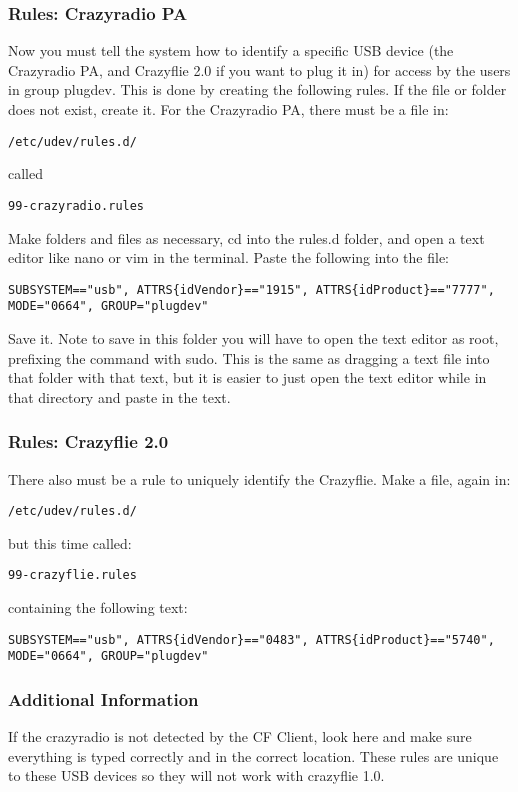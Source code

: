 \documentclass[12pt]{article}
\begin{document}
\subsubsection{Rules: Crazyradio PA}
Now you must tell the system how to identify a specific USB device (the Crazyradio PA, and Crazyflie 2.0 if you want to plug it in) for access by the users in group plugdev. This is done by creating the following rules. If the file or folder does not exist, create it.
For the Crazyradio PA, there must be a file in:
\begin{verbatim}
/etc/udev/rules.d/
\end{verbatim}
called
\begin{verbatim}
99-crazyradio.rules
\end{verbatim}
Make folders and files as necessary, cd into the rules.d folder, and open a text editor like nano or vim in the terminal. Paste the following into the file:
\begin{verbatim}
SUBSYSTEM=="usb", ATTRS{idVendor}=="1915", ATTRS{idProduct}=="7777",
MODE="0664", GROUP="plugdev"
\end{verbatim}
Save it. Note to save in this folder you will have to open the text editor as root, prefixing the command with sudo. This is the same as dragging a text file into that folder with that text, but it is easier to just open the text editor while in that directory and paste in the text.

\subsubsection{Rules: Crazyflie 2.0}
There also must be a rule to uniquely identify the Crazyflie. Make a file, again in:
\begin{verbatim}
/etc/udev/rules.d/
\end{verbatim}
but this time called:
\begin{verbatim}
99-crazyflie.rules
\end{verbatim}

containing the following text:
\begin{verbatim}
SUBSYSTEM=="usb", ATTRS{idVendor}=="0483", ATTRS{idProduct}=="5740",
MODE="0664", GROUP="plugdev"
\end{verbatim}

\subsubsection{Additional Information}
If the crazyradio is not detected by the CF Client, look here and make sure everything is typed correctly and in the correct location. These rules are unique to these USB devices so they will not work with crazyflie 1.0.
\end{document}
